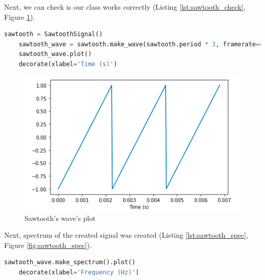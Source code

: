 \documentclass[a4paper]{article}
\begin{document}
        Next, we can check is our class works correctly (Listing \ref{lst:sawtooth_check}, Figure \ref{fig:sawtooth_wave_plot}).
            
        \begin{lstlisting}[language=Python,caption=Sawtooth wave plot code,label={lst:sawtooth_check}]
    sawtooth = SawtoothSignal()
    sawtooth_wave = sawtooth.make_wave(sawtooth.period * 3, framerate=40000)
    sawtooth_wave.plot()
    decorate(xlabel='Time (s)')
        \end{lstlisting}

        \begin{figure}[H]
          \centering
          \includegraphics[width=\textwidth]{img/sawtooth_wave.png}
          \caption{Sawtooth's wave's plot}
          \label{fig:sawtooth_wave_plot}
        \end{figure}
            
        Next, spectrum of the created signal was created (Listing \ref{lst:sawtooth_spec}, Figure \ref{fig:sawtooth_spec}).
            
        \begin{lstlisting}[language=Python,caption=Sawtooth's spectrum computation,label={lst:sawtooth_spec}]
    sawtooth_wave.make_spectrum().plot()
    decorate(xlabel='Frequency (Hz)')
        \end{lstlisting}
        
\end{document}
